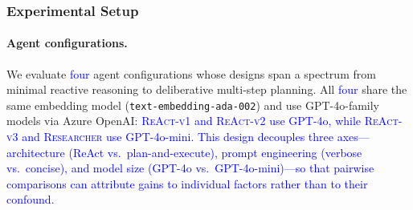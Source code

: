 
\subsubsection{Experimental Setup}
\label{sec:exp-setup}

\paragraph{Agent configurations.}
\label{sec:agent-configs}
We evaluate \textcolor{blue}{four} agent configurations whose designs span a spectrum from minimal reactive reasoning to deliberative multi-step planning. All \textcolor{blue}{four} share the same embedding model (\texttt{text-embedding-ada-002}) and use GPT-4o-family models via Azure OpenAI\textcolor{blue}{: \textsc{ReAct-v1} and \textsc{ReAct-v2} use GPT-4o, while \textsc{ReAct-v3} and \textsc{Researcher} use GPT-4o-mini. This design decouples three axes---architecture (ReAct vs.\ plan-and-execute), prompt engineering (verbose vs.\ concise), and model size (GPT-4o vs.\ GPT-4o-mini)---so that pairwise comparisons can attribute gains to individual factors rather than to their confound.}

